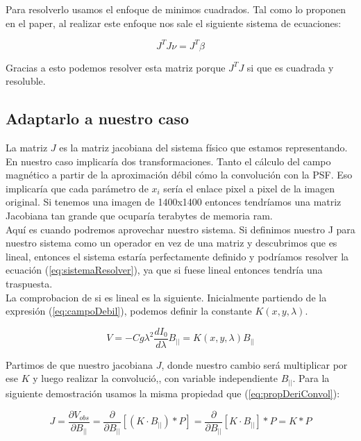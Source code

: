 Para resolverlo usamos el enfoque de minimos cuadrados. Tal como lo proponen en el paper, al realizar este enfoque nos sale el siguiente sistema de ecuaciones:

\begin{equation}
    \label{eq:sistemaResolver}
    J^T J \nu = J^T \beta
\end{equation}

Gracias a esto podemos resolver esta matriz porque $J^T J$ si que es cuadrada y resoluble.

\subsection{Adaptarlo a nuestro caso}
La matriz $J$ es la matriz jacobiana del sistema físico que estamos representando. En nuestro caso implicaría dos transformaciones. Tanto el cálculo del campo magnético a partir de la aproximación débil cómo la convolución con la PSF. Eso implicaría que cada parámetro de $x_i$ sería el enlace pixel a pixel de la imagen original. Si tenemos una imagen de 1400x1400 entonces tendríamos una matriz Jacobiana tan grande que ocuparía terabytes de memoria ram.\\

Aquí es cuando podremos aprovechar nuestro sistema. Si definimos nuestro J para nuestro sistema como un operador en vez de una matriz y descubrimos que es lineal, entonces el sistema estaría perfectamente definido y podríamos resolver la ecuación (\ref{eq:sistemaResolver}), ya que si fuese lineal entonces tendría una traspuesta.\\

La comprobacion de si es lineal es la siguiente. Inicialmente partiendo de la expresión (\ref{eq:campoDebil}), podemos definir la constante $K(x, y, \lambda)$.

\begin{equation}
    V = - C g \lambda^2 \frac{dI_0}{d \lambda} B_{||} = K(x, y, \lambda) B_{||}
\end{equation}

Partimos de que nuestro jacobiana $J$, donde nuestro cambio será multiplicar por ese $K$ y luego realizar la convolució,, con variable independiente $B_{||}$. Para la siguiente demostración usamos la misma propiedad que (\ref{eq:propDeriConvol}):

\begin{equation}
    \label{eq:demosLinealidad}
    J = \frac{\partial V_{obs}}{\partial B_{||}} = \frac{\partial}{\partial B_{||}} \left[(K \cdot B_{||}) * P \right] = \frac{\partial}{\partial B_{||}} \left[K \cdot B_{||}\right] * P = K * P
\end{equation}

